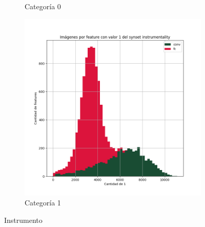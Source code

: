 \documentclass[12,twoside]{TFG-GM}
\theoremstyle{definition}
\theoremstyle{remark}
\begin{document}
\begin{figure}[ht]
\begin{subfigure}[b]{0.3\textwidth}
		\caption{Categoría 0}
	\end{subfigure}
	\begin{subfigure}[b]{0.3\textwidth}
		\includegraphics[width=\textwidth]  {Images/plots/25/synsets/Images_per_feature_of_1_category_instrumentalityall_layers.png}
		\caption{Categoría 1}
	\end{subfigure}       
	\caption{Instrumento}
\end{figure}
\end{document}

